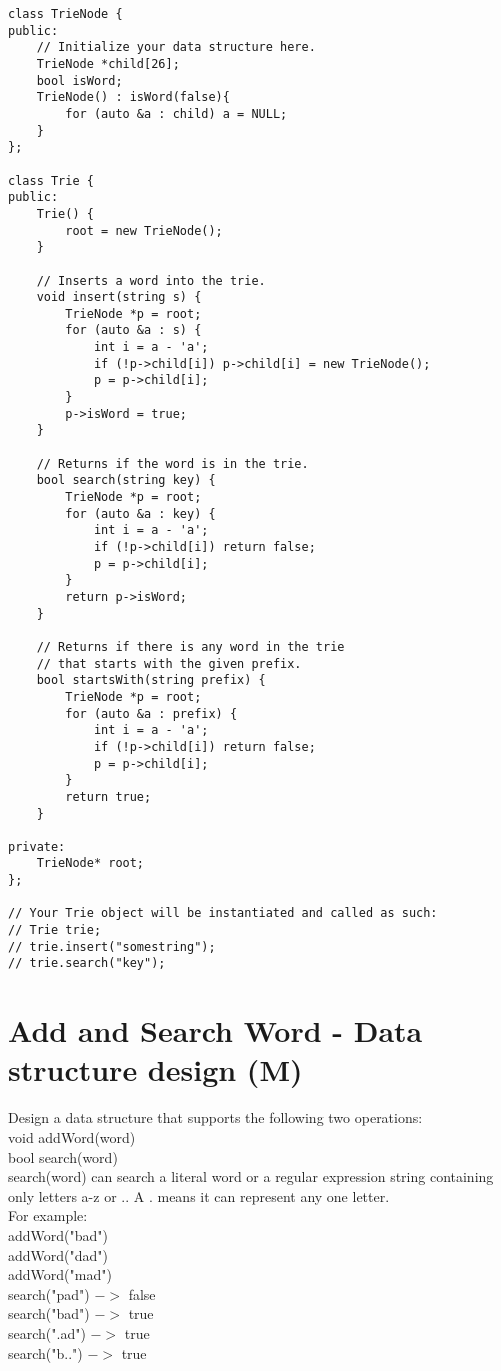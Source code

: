 \begin{lstlisting}
class TrieNode {
public:
    // Initialize your data structure here.
    TrieNode *child[26];
    bool isWord;
    TrieNode() : isWord(false){
        for (auto &a : child) a = NULL;
    }
};

class Trie {
public:
    Trie() {
        root = new TrieNode();
    }

    // Inserts a word into the trie.
    void insert(string s) {
        TrieNode *p = root;
        for (auto &a : s) {
            int i = a - 'a';
            if (!p->child[i]) p->child[i] = new TrieNode();
            p = p->child[i];
        }
        p->isWord = true;
    }

    // Returns if the word is in the trie.
    bool search(string key) {
        TrieNode *p = root;
        for (auto &a : key) {
            int i = a - 'a';
            if (!p->child[i]) return false;
            p = p->child[i];
        }
        return p->isWord;
    }

    // Returns if there is any word in the trie
    // that starts with the given prefix.
    bool startsWith(string prefix) {
        TrieNode *p = root;
        for (auto &a : prefix) {
            int i = a - 'a';
            if (!p->child[i]) return false;
            p = p->child[i];
        }
        return true;
    }

private:
    TrieNode* root;
};

// Your Trie object will be instantiated and called as such:
// Trie trie;
// trie.insert("somestring");
// trie.search("key");
\end{lstlisting}


\section{Add and Search Word - Data structure design (M)}
Design a data structure that supports the following two operations:\\
void addWord(word)\\
bool search(word)\\
search(word) can search a literal word or a regular expression string containing only letters a-z or .. A . means it can represent any one letter.\\

For example:\\
addWord("bad")\\
addWord("dad")\\
addWord("mad")\\
search("pad") $->$ false\\
search("bad") $->$ true\\
search(".ad") $->$ true\\
search("b..") $->$ true\\

